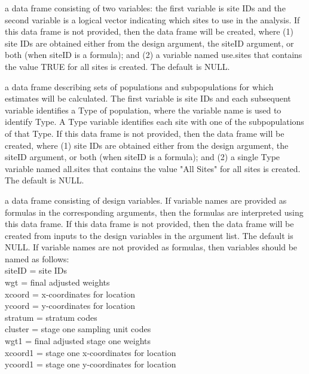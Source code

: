\begin{Arguments}
\begin{ldescription}
\item[\code{sites}] a data frame consisting of two variables: the first variable is 
site IDs and the second variable is a logical vector indicating which 
sites to use in the analysis.  If this data frame is not provided,  
then the data frame will be created, where (1) site IDs are obtained  
either from the design argument, the siteID argument, or both (when  
siteID is a formula); and (2) a variable named use.sites that contains the 
value TRUE for all sites is created.  
The default is NULL.
\item[\code{subpop}] a data frame describing sets of populations and subpopulations 
for which estimates will be calculated.  The first variable is site  
IDs and each subsequent variable identifies a Type of population,  
where the variable name is used to identify Type.  A Type variable  
identifies each site with one of the subpopulations of that Type.  If   
this data frame is not provided, then the data frame will be created,  
where (1) site IDs are obtained either from the design argument, the  
siteID argument, or both (when siteID is a formula); and (2) a single Type 
variable named all.sites that contains the value "All Sites" for all sites 
is created.  The default is NULL.
\item[\code{design}] a data frame consisting of design variables.  If variable names 
are provided as formulas in the corresponding arguments, then the 
formulas are interpreted using this data frame.  If this data frame is 
not provided, then the data frame will be created from inputs to the 
design variables in the argument list.  The default is NULL.  If 
variable names are not provided as formulas, then variables should be 
named as follows:\\
siteID = site IDs\\
wgt = final adjusted weights\\
xcoord = x-coordinates for location\\
ycoord = y-coordinates for location\\
stratum = stratum codes\\
cluster = stage one sampling unit codes\\
wgt1 = final adjusted stage one weights\\
xcoord1 = stage one x-coordinates for location\\
ycoord1 = stage one y-coordinates for location\\

\end{ldescription}
\end{Arguments}
